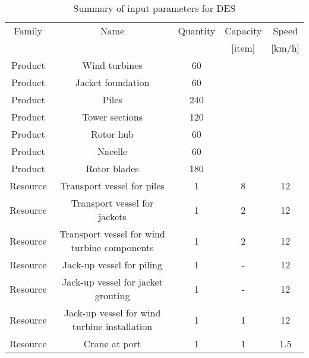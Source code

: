 \begin{table}[!hbp]
\caption{Summary of input parameters for DES}
\begin{center}
\begin{tabular}{ccccc}
\hline 
Family & Name & Quantity & Capacity & Speed \\
& & & [item] & [km/h] \\ 
\hline 
Product & Wind turbines & 60 & & \\ 
Product & Jacket foundation & 60 & & \\
Product & Piles & 240 & & \\
Product & Tower sections & 120 & & \\ 
Product & Rotor hub & 60 & & \\ 
Product & Nacelle & 60 & & \\ 
Product & Rotor blades & 180 & & \\ 
\hline
Resource & Transport vessel for piles & 1 & 8 & 12 \\ 
Resource & Transport vessel for jackets & 1 & 2 & 12 \\ 
Resource & Transport vessel for wind turbine components & 1 & 2 & 12 \\ 
Resource & Jack-up vessel for piling & 1 & - & 12\\
Resource & Jack-up vessel for jacket grouting & 1 & - & 12\\
Resource & Jack-up vessel for wind turbine installation & 1 & 1 & 12 \\
Resource & Crane at port & 1 & 1 & 1.5 \\
\hline 
\end{tabular}
\end{center}
\label{TableInput}
\end{table}
